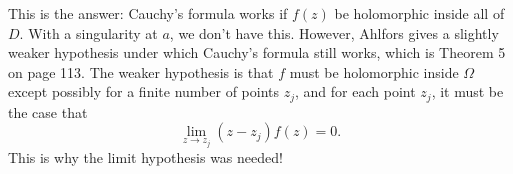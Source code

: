 \documentclass[12pt,oneside]{amsart}
\begin{document}
This is the answer: Cauchy's formula works if $f(z)$ be holomorphic inside all of $D$. With a singularity at $a$, we don't have this. However, Ahlfors gives a slightly weaker hypothesis under which Cauchy's formula still works, which is Theorem 5 on page 113. The weaker hypothesis is that $f$ must be holomorphic inside $\Omega$ except possibly for a finite number of points $z_j$, and for each point $z_j$, it must be the case that
\[\lim_{z\to z_j}(z-z_j)f(z)=0.\]
This is why the limit hypothesis was needed!
\end{document}
